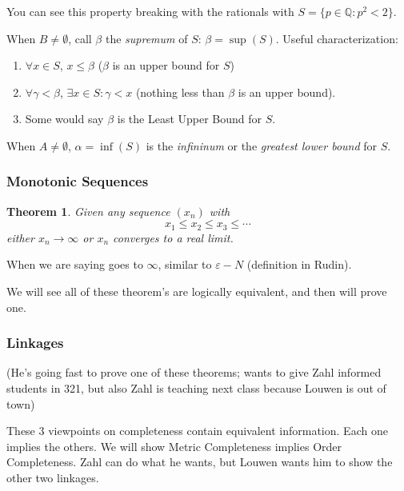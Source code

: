 \documentclass{article}
\theoremstyle{plain}
\newtheorem{theorem}{Theorem}
\theoremstyle{remark}
\newcommand{\Q}{{\mathbb Q}}
\newcommand{\ep}{{\varepsilon}}
\begin{document}
You can see this property breaking with the rationals with $S = \{p \in \Q \colon p^2 < 2\}$.

When $B \neq \emptyset$, call $\beta$ the \emph{supremum} of $S$: $\beta = \sup(S)$.
Useful characterization:
\begin{enumerate}
	\item $\forall x \in S$, $x \leq \beta$ ($\beta$ is an upper bound for $S$)
	\item $\forall \gamma < \beta$, $\exists x \in S \colon \gamma < x$
		(nothing less than $\beta$ is an upper bound).
	\item Some would say $\beta$ is the Least Upper Bound for $S$.
\end{enumerate}

When $A \neq \emptyset$, $\alpha = \inf(S)$ is the \emph{infininum}
or the \emph{greatest lower bound} for $S$.

\subsubsection{Monotonic Sequences}
\begin{theorem}
	Given any sequence $(x_n)$ with
	\[
		x_1 \leq x_2 \leq x_3 \leq \cdots
	\]
	either $x_n \to \infty$ or $x_n$ converges to a real limit.
\end{theorem}
When we are saying goes to $\infty$, similar to $\ep-N$ (definition in Rudin).

We will see all of these theorem's are logically equivalent,
and then will prove one.

\subsubsection{Linkages}
(He's going fast to prove one of these theorems;
wants to give Zahl informed students in 321,
but also Zahl is teaching next class because Louwen is out of town)

These 3 viewpoints on completeness contain equivalent information.
Each one implies the others.
We will show Metric Completeness implies Order Completeness.
Zahl can do what he wants, but Louwen wants him to show the other two linkages.
\end{document}
